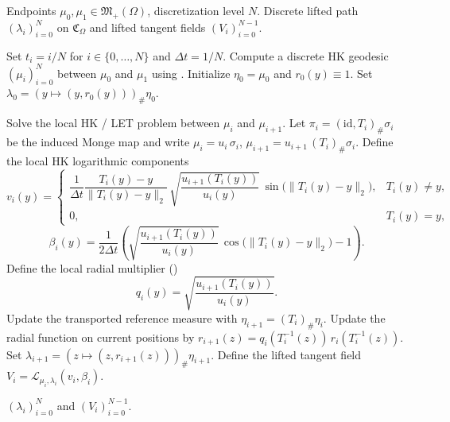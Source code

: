 \documentclass[11pt]{article}
\begin{document}
\begin{algorithm}[H]
\caption{Isometric lifting and interpolation procedure}
\label{alg:isometric-lift}
\begin{algorithmic}[1]
\Require Endpoints $\mu_0,\mu_1 \in \mathfrak{M}_+(\Omega)$, discretization level $N$.
\Ensure Discrete lifted path $(\lambda_i)_{i=0}^N$ on $\mathfrak{C}_{\Omega}$ and lifted tangent fields $(V_i)_{i=0}^{N-1}$.

\State Set $t_i=i/N$ for $i\in\{0,\dots,N\}$ and $\Delta t=1/N$.
\State Compute a discrete HK geodesic $(\mu_i)_{i=0}^N$ between $\mu_0$ and $\mu_1$ using .
\State Initialize $\eta_0 = \mu_0$ and $r_0(y)\equiv 1$.
\State Set $\lambda_0 = (y\mapsto (y,r_0(y)))_\# \eta_0$.

    \State Solve the local HK / LET problem between $\mu_i$ and $\mu_{i+1}$.
    \State Let $\pi_i=(\mathrm{id},T_i)_\#\sigma_i$ be the induced Monge map and write
    $\mu_i=u_i\,\sigma_i$, $\mu_{i+1}=u_{i+1}\,(T_i)_\#\sigma_i.$
    \State Define the local HK logarithmic components
    \[
        v_i(y)=
        \begin{cases}
        \dfrac{1}{\Delta t}\dfrac{T_i(y)-y}{\|T_i(y)-y\|_2}\,
        \sqrt{\dfrac{u_{i+1}(T_i(y))}{u_i(y)}}\,
        \sin\bigl(\|T_i(y)-y\|_2\bigr),
        & T_i(y)\neq y,\\[2ex]
        0, & T_i(y)=y,
        \end{cases}
    \]
    \[
        \beta_i(y)
        =
        \frac{1}{2\Delta t}\left(
        \sqrt{\dfrac{u_{i+1}(T_i(y))}{u_i(y)}}\,
        \cos\bigl(\|T_i(y)-y\|_2\bigr)-1
        \right).
    \]
    \State Define the local radial multiplier ()
    \[
        q_i(y)= \sqrt{\frac{u_{i+1}(T_i(y))}{u_i(y)}}.
    \]
    \State Update the transported reference measure
    with $\eta_{i+1}= (T_i)_\#\eta_i.$
    \State Update the radial function on current positions by $r_{i+1}(z)= q_i(T_i^{-1}(z))\,r_i(T_i^{-1}(z)).$
    \State Set $\lambda_{i+1}= (z\mapsto (z,r_{i+1}(z)))_\#\eta_{i+1}.$
    \State Define the lifted tangent field $V_i= \mathcal{L}_{\mu_i,\lambda_i}(v_i,\beta_i).$
\EndFor

\State \Return $(\lambda_i)_{i=0}^N$ and $(V_i)_{i=0}^{N-1}$.
\end{algorithmic}
\end{algorithm}
\end{document}
